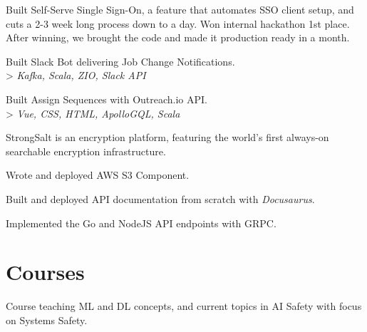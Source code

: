 \documentclass[]{deedy-resume-openfont}
\begin{document}
\begin{minipage}[t]{0.66\textwidth}
\begin{tightemize}
\end{tightemize}
\sectionsep
{}
\vspace{\topsep} %
\begin{tightemize}
\item Built Self-Serve Single Sign-On, a feature that automates SSO client setup, and cuts a 2-3 week long process down to a day. 
Won internal hackathon 1st place. After winning, we brought the code and made it production ready in a month.
\item Built Slack Bot delivering Job Change Notifications. \\ > \emph{Kafka, Scala, ZIO, Slack API}
\item Built Assign Sequences with Outreach.io API.\\ > \emph{Vue, CSS, HTML, ApolloGQL, Scala}
\end{tightemize}
\sectionsep
{}
\vspace{\topsep} %
\begin{tightemize}
\item StrongSalt is an encryption platform, featuring the world’s first always-on searchable encryption infrastructure.
\item Wrote and deployed AWS S3 Component.
\item Built and deployed API documentation from scratch with \textit{Docusaurus}.
\item Implemented the Go and NodeJS API endpoints with GRPC.
\end{tightemize}
\sectionsep


\section{Courses}
\begin{tightemize}
\item Course teaching ML and DL concepts, and current topics in AI Safety with focus on Systems Safety.
\end{tightemize}
\sectionsep


\end{minipage}
\end{document}
